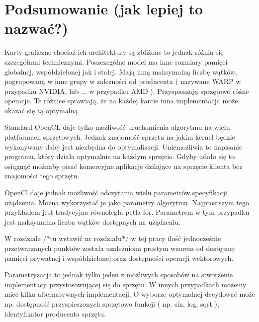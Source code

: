 
\section{Podsumowanie (jak lepiej to nazwać?)}

Karty graficzne chociaż ich architektury są zbliżone to jednak różnią się szczegółami technicznymi. Poszczególne model ma inne rozmiary pamięci globalnej, współdzielonej jak i stałej.
Mają inną maksymalną liczbę wątków, pogrupowaną w inne grupy w zależności od producenta ( nazywane WARP w przypadku NVIDIA, lub ... w przypadku AMD ). Przyspieszają sprzętowo różne operacje. Te różnice sprawiają, że na każdej karcie inna implementacja może okazać się tą optymalną. \linebreak


Standard OpenCL daje tylko możliwość uruchomienia algorytmu na wielu platformach sprzętowych. Jednak znajomość sprzętu na jakim kernel będzie wykonywany dalej jest niezbędna do optymalizacji. 
Uniemożliwia to napisanie programu, który działa optymalnie na każdym sprzęcie. Gdyby udało się to osiągnąć możnaby pisać komercyjne aplikacje dzilające na sprzęcie klienta bez znajomości tego sprzętu. \linebreak




OpenCl daje jednak możliwość odczytania wielu parametrów specyfikacji użądzenia. Można wykorzystać je jako parametry algorytmu. Najprostszym tego przykładem jest tradycyjna równoległa pętla for. Parametrem w tym przypadku jest maksymalna liczba wątków dostępnych na użądzeniu.
\linebreak



W rozdziale /*tu wstawić nr rozdziału*/ w tej pracy ilość jednocześnie przetwarzanych punktów została uzależniona prostym wzorem od dostępnej pamięci prywatnej i współdzielonej oraz dostępności operacji wektorowych.
\linebreak

Parametryzacja to jednak tylko jeden z możliwych sposobów na stworzenie implementacji przystosowującej się do sprzętu. 
W innych przypadkach możemy mieć kilka alternatywnych implementacji. O wyborze optymalnej decydować może np. dostępność przyspieszonych sprzętowo funkcji ( np. sin, log, sqrt ), identyfikator producenta sprzętu.


